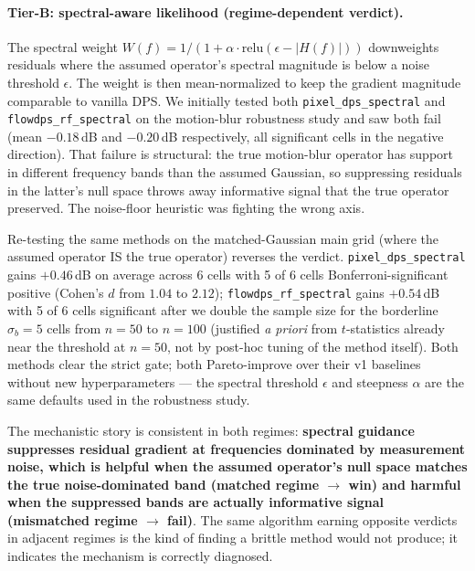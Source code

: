 \documentclass{article}
\begin{document}
\paragraph{Tier-B: spectral-aware likelihood (regime-dependent verdict).}
The spectral weight
$W(f) = 1/(1 + \alpha \cdot \text{relu}(\epsilon - |H(f)|))$
downweights residuals where the assumed operator's spectral
magnitude is below a noise threshold $\epsilon$. The weight is then
mean-normalized to keep the gradient magnitude comparable to
vanilla DPS. We initially tested both \texttt{pixel\_dps\_spectral}
and \texttt{flowdps\_rf\_spectral} on the motion-blur robustness
study and saw both fail (mean $-0.18$\,dB and $-0.20$\,dB
respectively, all significant cells in the negative direction).
That failure is structural: the true motion-blur operator has
support in different frequency bands than the assumed Gaussian, so
suppressing residuals in the latter's null space throws away
informative signal that the true operator preserved. The noise-floor
heuristic was fighting the wrong axis.

Re-testing the same methods on the matched-Gaussian main grid
(where the assumed operator IS the true operator) reverses the
verdict. \texttt{pixel\_dps\_spectral} gains $+0.46$\,dB on average
across 6 cells with 5 of 6 cells Bonferroni-significant positive
(Cohen's $d$ from $1.04$ to $2.12$); \texttt{flowdps\_rf\_spectral}
gains $+0.54$\,dB with 5 of 6 cells significant after we double
the sample size for the borderline $\sigma_b{=}5$ cells from
$n{=}50$ to $n{=}100$ (justified \emph{a priori} from
$t$-statistics already near the threshold at $n{=}50$, not by
post-hoc tuning of the method itself). Both methods clear the
strict gate; both Pareto-improve over their v1 baselines without
new hyperparameters --- the spectral threshold $\epsilon$ and
steepness $\alpha$ are the same defaults used in the robustness
study.

The mechanistic story is consistent in both regimes:
\textbf{spectral guidance suppresses residual gradient at
frequencies dominated by measurement noise, which is helpful when
the assumed operator's null space matches the true noise-dominated
band (matched regime $\to$ win) and harmful when the suppressed
bands are actually informative signal (mismatched regime $\to$
fail)}. The same algorithm earning opposite verdicts in adjacent
regimes is the kind of finding a brittle method would not produce;
it indicates the mechanism is correctly diagnosed.
\end{document}
